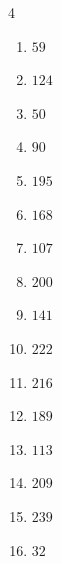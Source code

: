 \begin{multicols}{4}
\begin{enumerate}
  \item $59$


  \item $124$


  \item $50$


  \item $90$


  \item $195$


  \item $168$


  \item $107$


  \item $200$


  \item $141$


  \item $222$


  \item $216$


  \item $189$


\columnbreak %

  \item $113$


  \item $209$


  \item $239$


  \item $32$


\end{enumerate}
\end{multicols}
